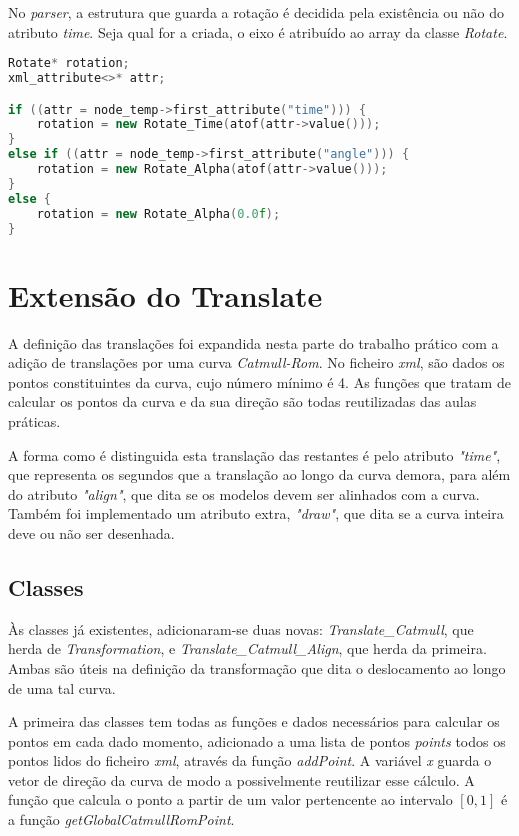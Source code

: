 \documentclass[14pt, a4 paper]{report}
\begin{document}
No \textit{parser}, a estrutura que guarda a rotação é decidida pela existência ou não do atributo \textit{time}. Seja qual for a criada, o eixo é atribuído ao array da classe \textit{Rotate}.

\begin{lstlisting}[language = c++]
Rotate* rotation;
xml_attribute<>* attr;

if ((attr = node_temp->first_attribute("time"))) {
    rotation = new Rotate_Time(atof(attr->value()));
}
else if ((attr = node_temp->first_attribute("angle"))) {
    rotation = new Rotate_Alpha(atof(attr->value()));
}
else {
    rotation = new Rotate_Alpha(0.0f);
}
\end{lstlisting}

\section{Extensão do Translate}

A definição das translações foi expandida nesta parte do trabalho prático com a adição de translações por uma curva \textit{Catmull-Rom}. No ficheiro \textit{xml}, são dados os pontos constituintes da curva, cujo número mínimo é 4. As funções que tratam de calcular os pontos da curva e da sua direção são todas reutilizadas das aulas práticas.

A forma como é distinguida esta translação das restantes é pelo atributo \textit{"time"}, que representa os segundos que a translação ao longo da curva demora, para além do atributo \textit{"align"}, que dita se os modelos devem ser alinhados com a curva. Também foi implementado um atributo extra, \textit{"draw"}, que dita se a curva inteira deve ou não ser desenhada.

\subsection{Classes}

Às classes já existentes, adicionaram-se duas novas: \textit{Translate\_Catmull}, que herda de \textit{Transformation}, e \textit{Translate\_Catmull\_Align}, que herda da primeira. Ambas são úteis na definição da transformação que dita o deslocamento ao longo de uma tal curva.

A primeira das classes tem todas as funções e dados necessários para calcular os pontos em cada dado momento, adicionado a uma lista de pontos \textit{points} todos os pontos lidos do ficheiro \textit{xml}, através da função \textit{addPoint}. A variável \textit{x} guarda o vetor de direção da curva de modo a possivelmente reutilizar esse cálculo. A função que calcula o ponto a partir de um valor pertencente ao intervalo $[0,1]$ é a função \textit{getGlobalCatmullRomPoint}.
\end{document}
